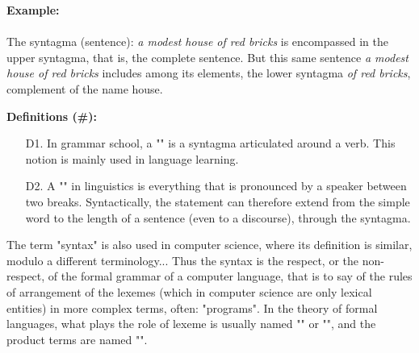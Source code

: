 	\begin{tcolorbox}[colframe=black,colback=white,sharp corners]
	\textbf{{\Large {}}Example:}\\\\
	The syntagma (sentence): \textit{a modest house of red bricks} is encompassed in the upper syntagma, that is, the complete sentence. But this same sentence \textit{a modest house of red bricks} includes among its elements, the lower syntagma \textit{of red bricks}, complement of the name house.
	\end{tcolorbox}
	
	\textbf{Definitions (\#\mydef):} 
	\begin{enumerate}
		\item[D1.] In grammar school, a "" is a syntagma articulated around a verb. This notion is mainly used in language learning.

		\item[D2.] A "" in linguistics is everything that is pronounced by a speaker between two breaks. Syntactically, the statement can therefore extend from the simple word to the length of a sentence (even to a discourse), through the syntagma.
	\end{enumerate}
	The term "syntax" is also used in computer science, where its definition is similar, modulo a different terminology... Thus the syntax is the respect, or the non-respect, of the formal grammar of a computer language, that is to say of the rules of arrangement of the lexemes (which in computer science are only lexical entities) in more complex terms, often: "programs". In the theory of formal languages, what plays the role of lexeme is usually named "" or "", and the product terms are named "".
	
